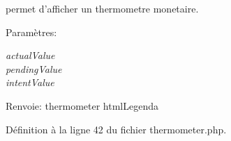 permet d'afficher un thermometre monetaire. 

\begin{Desc}
\item[Param\`{e}tres:]
\begin{description}
\item[{\em actual\-Value}]\item[{\em pending\-Value}]\item[{\em intent\-Value}]\end{description}
\end{Desc}
\begin{Desc}
\item[Renvoie:]thermometer html\-Legenda \end{Desc}


D\'{e}finition \`{a} la ligne 42 du fichier thermometer.php.